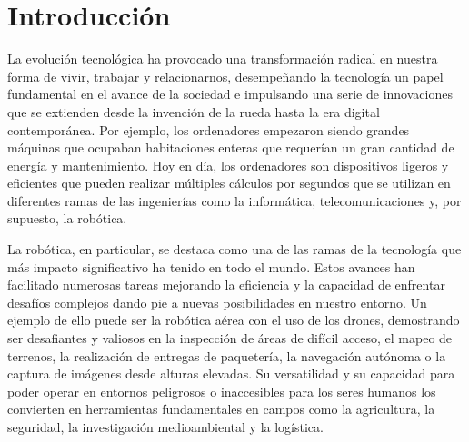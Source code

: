 \chapter{Introducción}
\label{cap:introduccion}
\setcounter{page}{1}

La evolución tecnológica ha provocado una transformación radical en nuestra forma de vivir, trabajar y relacionarnos, desempeñando la tecnología un papel 
fundamental en el avance de la sociedad e impulsando una serie de innovaciones que se extienden desde la invención de la rueda hasta la era digital contemporánea. 
Por ejemplo, los ordenadores empezaron siendo grandes máquinas que ocupaban habitaciones enteras que requerían un gran cantidad de energía y mantenimiento. Hoy en día, los ordenadores
son dispositivos ligeros y eficientes que pueden realizar múltiples cálculos por segundos que se utilizan en diferentes ramas de las ingenierías como la informática, telecomunicaciones y,
por supuesto, la robótica.

La robótica, en particular, se destaca como una de las ramas de la tecnología que más impacto significativo ha tenido en todo el mundo. Estos avances han facilitado numerosas tareas mejorando la eficiencia 
y la capacidad de enfrentar desafíos complejos dando pie a nuevas posibilidades en nuestro entorno. Un ejemplo de ello puede ser la robótica aérea con el uso de los drones, 
demostrando ser desafiantes y valiosos en la inspección de áreas de difícil acceso, el mapeo de terrenos, la realización de entregas de paquetería, la navegación autónoma o la captura 
de imágenes desde alturas elevadas. Su versatilidad y su capacidad para poder operar en entornos peligrosos o inaccesibles para los seres humanos los convierten 
en herramientas fundamentales en campos como la agricultura, la seguridad, la investigación medioambiental y la logística. 

